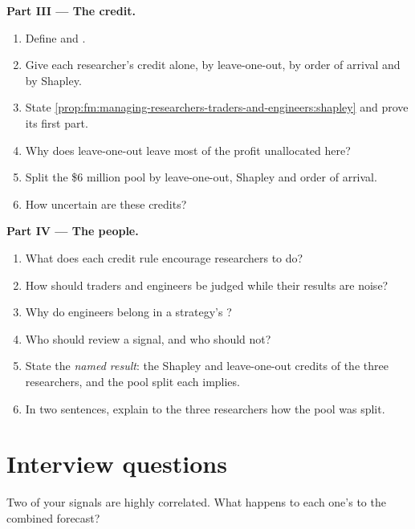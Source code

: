 \begin{problem}
\medskip\noindent\textbf{Part III --- The credit.}
\begin{enumerate}[resume]
\item Define  and .
\item Give each researcher's credit alone, by leave-one-out, by order of arrival and by Shapley.
\item State \cref{prop:fm:managing-researchers-traders-and-engineers:shapley} and prove its first part.
\item Why does leave-one-out leave most of the profit unallocated here?
\item Split the \$6 million pool by leave-one-out, Shapley and order of arrival.
\item How uncertain are these credits?
\end{enumerate}

\medskip\noindent\textbf{Part IV --- The people.}
\begin{enumerate}[resume]
\item What does each credit rule encourage researchers to do?
\item How should traders and engineers be judged while their results are noise?
\item Why do engineers belong in a strategy's ?
\item Who should review a signal, and who should not?
\item State the \emph{named result}: the Shapley and leave-one-out credits of the three researchers, and the pool split each implies.
\item In two sentences, explain to the three researchers how the pool was split.
\end{enumerate}
\end{problem}

\section{Interview questions}

\begin{interviewq}\label{iq:fm:managing-researchers-traders-and-engineers:1}
Two of your signals are highly correlated. What happens to each one's  to the combined forecast?
\end{interviewq}

